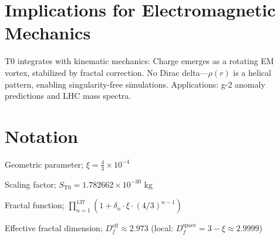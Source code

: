 	\section{Implications for Electromagnetic Mechanics}
	\label{sec:emm}
	
	T0 integrates with kinematic mechanics: Charge emerges as a rotating EM vortex, stabilized by fractal correction. No Dirac delta—$\rho(r)$ is a helical pattern, enabling singularity-free simulations. Applications: g-2 anomaly predictions and LHC mass spectra.
	
	\section{Notation}
	\begin{description}[leftmargin=1cm]
		\item[$\xi$] Geometric parameter; $\xi = \frac{4}{3} \times 10^{-4}$
		\item[$S_{\mathrm{T0}}$] Scaling factor; $S_{\mathrm{T0}} = 1.782662 \times 10^{-30}$ kg
		\item[$f_{\text{fractal}}$] Fractal function; $\prod_{n=1}^{137} (1 + \delta_n \cdot \xi \cdot (4/3)^{n-1})$
		\item[$D_f^{\text{eff}}$] Effective fractal dimension; $D_f^{\text{eff}} \approx 2.973$ (local: $D_f^{\text{space}} = 3 - \xi \approx 2.9999$)
	\end{description}
	
	\begin{center}
	\end{center}
